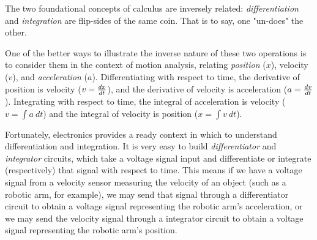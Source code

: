 The two foundational concepts of calculus are inversely related: {\it differentiation} and {\it integration} are flip-sides of the same coin.  That is to say, one "un-does" the other.

One of the better ways to illustrate the inverse nature of these two operations is to consider them in the context of motion analysis, relating {\it position} ($x$), velocity ($v$), and {\it acceleration} ($a$).  Differentiating with respect to time, the derivative of position is velocity ($v = {dx \over dt}$), and the derivative of velocity is acceleration ($a = {dv \over dt}$).  Integrating with respect to time, the integral of acceleration is velocity ($v = \int a \> dt$) and the integral of velocity is position ($x = \int v \> dt$).

Fortunately, electronics provides a ready context in which to understand differentiation and integration.  It is very easy to build {\it differentiator} and {\it integrator} circuits, which take a voltage signal input and differentiate or integrate (respectively) that signal with respect to time.  This means if we have a voltage signal from a velocity sensor measuring the velocity of an object (such as a robotic arm, for example), we may send that signal through a differentiator circuit to obtain a voltage signal representing the robotic arm's acceleration, or we may send the velocity signal through a integrator circuit to obtain a voltage signal representing the robotic arm's position.






